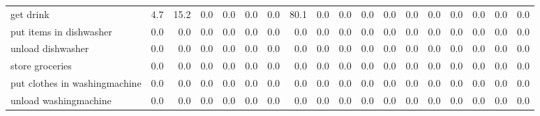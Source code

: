 \documentclass{article}
\begin{document}
\begin{sideways}
\begin{tabular}{lrrrrrrrrrrrrrrrrr}
get drink                     &         4.7 &               15.2 &           0.0 &               0.0 &                0.0 &                0.0 &             80.1 &                      0.0 &                   0.0 &              0.0 &              0.0 &                            0.0 &                      0.0 &                    0.0 &                                  0.0 &                          0.0 &                  0.0 \\
put items in dishwasher       &         0.0 &                0.0 &           0.0 &               0.0 &                0.0 &                0.0 &              0.0 &                      0.0 &                   0.0 &              0.0 &              0.0 &                            0.0 &                      0.0 &                    0.0 &                                  0.0 &                          0.0 &                  0.0 \\
unload dishwasher             &         0.0 &                0.0 &           0.0 &               0.0 &                0.0 &                0.0 &              0.0 &                      0.0 &                   0.0 &              0.0 &              0.0 &                            0.0 &                      0.0 &                    0.0 &                                  0.0 &                          0.0 &                  0.0 \\
store groceries               &         0.0 &                0.0 &           0.0 &               0.0 &                0.0 &                0.0 &              0.0 &                      0.0 &                   0.0 &              0.0 &              0.0 &                            0.0 &                      0.0 &                    0.0 &                                  0.0 &                          0.0 &                  0.0 \\
put clothes in washingmachine &         0.0 &                0.0 &           0.0 &               0.0 &                0.0 &                0.0 &              0.0 &                      0.0 &                   0.0 &              0.0 &              0.0 &                            0.0 &                      0.0 &                    0.0 &                                  0.0 &                          0.0 &                  0.0 \\
unload washingmachine         &         0.0 &                0.0 &           0.0 &               0.0 &                0.0 &                0.0 &              0.0 &                      0.0 &                   0.0 &              0.0 &              0.0 &                            0.0 &                      0.0 &                    0.0 &                                  0.0 &                          0.0 &                  0.0 \\

\end{tabular}
\end{sideways}
\end{document}
